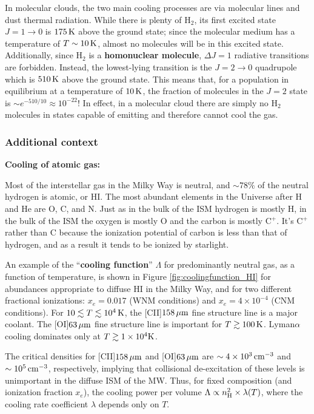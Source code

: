 \documentclass[a4paper,10pt]{article}
\begin{document}
In molecular clouds, the two main cooling processes are via molecular lines and dust thermal radiation. While there is plenty of H$_2$, its first excited state $J=1\rightarrow0$ is $175\,{\rm K}$ above the ground state; since the molecular medium has a temperature of $T\sim10\,{\rm K}$, almost no molecules will be in this excited state. Additionally, since H$_2$ is a \textbf{homonuclear molecule}, $\Delta J=1$ radiative transitions are forbidden. Instead, the lowest-lying transition is the $J=2\rightarrow0$ quadrupole which is $510\,{\rm K}$ above the ground state. This means that, for a population in equilibrium at a temperature of $10\,{\rm K}$, the fraction of molecules in the $J=2$ state is $\sim e^{-510/10}\approx10^{-22}$! In effect, in a molecular cloud there are simply no H$_2$ molecules in states capable of emitting and therefore cannot cool the gas.

\subsubsection{Additional context}

{\noindent}\textbf{Cooling of atomic gas:}

{\noindent}Most of the interstellar gas in the Milky Way is neutral, and $\sim78\%$ of the neutral hydrogen is atomic, or HI. The most abundant elements in the Universe after H and He are O, C, and N. Just as in the bulk of the ISM hydrogen is mostly H, in the bulk of the ISM the oxygen is mostly O and the carbon is mostly C$^+$. It's C$^+$ rather than C because the ionization potential of carbon is less than that of hydrogen, and as a result it tends to be ionized by starlight.

{\noindent}An example of the ``\textbf{cooling function}'' $\Lambda$ for predominantly neutral gas, as a function of temperature, is shown in Figure \ref{fig:coolingfunction_HI} for abundances appropriate to diffuse HI in the Milky Way, and for two different fractional ionizations: $x_e=0.017$ (WNM conditions) and $x_e=4\times10^{-4}$ (CNM conditions). For $10\lesssim T\lesssim10^4\,{\rm K}$, the [CII]$158\,\mu{\rm m}$ fine structure line is a major coolant. The [OI]$63\,\mu{\rm m}$ fine structure line is important for $T\gtrsim100\,{\rm K}$. Lyman$\alpha$ cooling dominates only at $T\gtrsim1\times10^4{\rm K}$. 

{\noindent}The critical densities for [CII]$158\,\mu{\rm m}$ and [OI]$63\,\mu{\rm m}$ are $\sim4\times10^3\,{\rm cm^{-3}}$ and $\sim10^5\,{\rm cm^{-3}}$, respectively, implying that collisional de-excitation of these levels is unimportant in the diffuse ISM of the MW. Thus, for fixed composition (and ionization fraction $x_e$), the cooling power per volume $\Lambda\propto n_{\rm H}^2\times\lambda(T)$, where the cooling rate coefficient $\lambda$ depends only on $T$.
\end{document}

